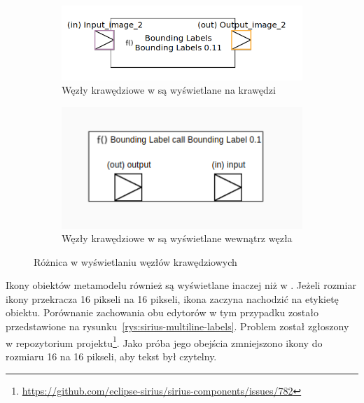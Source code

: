 \begin{figure}[b]
	\centering
	\begin{subfigure}{.49\textwidth}
		\centering
		\includegraphics[width=.99\linewidth]{./images/border-node-sirius-desktop.png}
		\caption{Węzły krawędziowe w \SiriusDesktop{} są wyświetlane na
      krawędzi}
	\end{subfigure}
	\begin{subfigure}{.49\textwidth}
		\centering
		\includegraphics[width=.99\linewidth]{./images/border-node-sirius-web.png}
		\caption{Węzły krawędziowe w \SiriusWeb{} są wyświetlane wewnątrz
      węzła}\label{rys:border-node-sirius-web}
	\end{subfigure}

    \caption{Różnica w wyświetlaniu węzłów
      krawędziowych}\label{rys:border-node-difference}
\end{figure}

Ikony obiektów metamodelu również są wyświetlane inaczej niż w
\SiriusDesktop{}. Jeżeli rozmiar ikony przekracza 16 pikseli na 16 pikseli,
ikona
zaczyna nachodzić na etykietę obiektu. Porównanie zachowania obu edytorów w
tym przypadku zostało przedstawione na
rysunku~\ref{rys:sirius-multiline-labels}. Problem został zgłoszony w
repozytorium projektu\footnote{
	\url{https://github.com/eclipse-sirius/sirius-components/issues/782}
}. Jako próba jego obejścia zmniejszono ikony do rozmiaru 16 na 16 pikseli, aby
tekst był czytelny.

